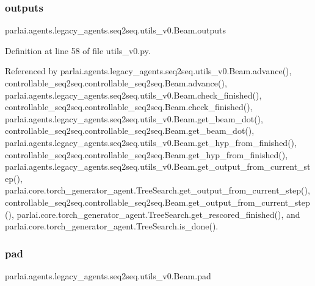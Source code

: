 \subsubsection{\texorpdfstring{outputs}{outputs}}
{\footnotesize\ttfamily parlai.\+agents.\+legacy\+\_\+agents.\+seq2seq.\+utils\+\_\+v0.\+Beam.\+outputs}



Definition at line 58 of file utils\+\_\+v0.\+py.



Referenced by parlai.\+agents.\+legacy\+\_\+agents.\+seq2seq.\+utils\+\_\+v0.\+Beam.\+advance(), controllable\+\_\+seq2seq.\+controllable\+\_\+seq2seq.\+Beam.\+advance(), parlai.\+agents.\+legacy\+\_\+agents.\+seq2seq.\+utils\+\_\+v0.\+Beam.\+check\+\_\+finished(), controllable\+\_\+seq2seq.\+controllable\+\_\+seq2seq.\+Beam.\+check\+\_\+finished(), parlai.\+agents.\+legacy\+\_\+agents.\+seq2seq.\+utils\+\_\+v0.\+Beam.\+get\+\_\+beam\+\_\+dot(), controllable\+\_\+seq2seq.\+controllable\+\_\+seq2seq.\+Beam.\+get\+\_\+beam\+\_\+dot(), parlai.\+agents.\+legacy\+\_\+agents.\+seq2seq.\+utils\+\_\+v0.\+Beam.\+get\+\_\+hyp\+\_\+from\+\_\+finished(), controllable\+\_\+seq2seq.\+controllable\+\_\+seq2seq.\+Beam.\+get\+\_\+hyp\+\_\+from\+\_\+finished(), parlai.\+agents.\+legacy\+\_\+agents.\+seq2seq.\+utils\+\_\+v0.\+Beam.\+get\+\_\+output\+\_\+from\+\_\+current\+\_\+step(), parlai.\+core.\+torch\+\_\+generator\+\_\+agent.\+Tree\+Search.\+get\+\_\+output\+\_\+from\+\_\+current\+\_\+step(), controllable\+\_\+seq2seq.\+controllable\+\_\+seq2seq.\+Beam.\+get\+\_\+output\+\_\+from\+\_\+current\+\_\+step(), parlai.\+core.\+torch\+\_\+generator\+\_\+agent.\+Tree\+Search.\+get\+\_\+rescored\+\_\+finished(), and parlai.\+core.\+torch\+\_\+generator\+\_\+agent.\+Tree\+Search.\+is\+\_\+done().

\mbox{\label{classparlai_1_1agents_1_1legacy__agents_1_1seq2seq_1_1utils__v0_1_1Beam_a2b566884e7d177fcbcdcad1547dcf070}} 
\subsubsection{\texorpdfstring{pad}{pad}}
{\footnotesize\ttfamily parlai.\+agents.\+legacy\+\_\+agents.\+seq2seq.\+utils\+\_\+v0.\+Beam.\+pad}



